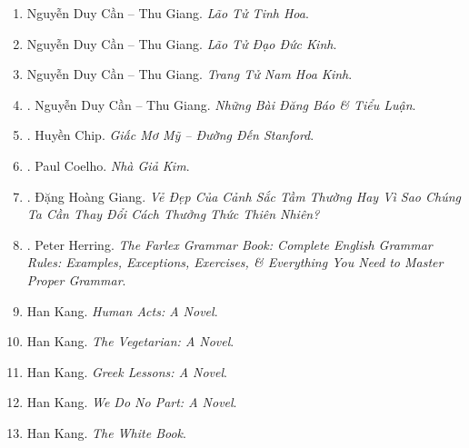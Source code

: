 \documentclass{article}
\begin{document}
\begin{enumerate}
	\item {\sc Nguyễn Duy Cần -- Thu Giang}. {\it Lão Tử Tinh Hoa}.

	\item {\sc Nguyễn Duy Cần -- Thu Giang}. {\it Lão Tử Đạo Đức Kinh}.

	\item {\sc Nguyễn Duy Cần -- Thu Giang}. {\it Trang Tử Nam Hoa Kinh}.

	\item \cite{Can_essay}. {\sc Nguyễn Duy Cần -- Thu Giang}. {\it Những Bài Đăng Báo \& Tiểu Luận}.\hfill{\sf[done]}

	\item \cite{Chip_US_dream}. {\sc Huyền Chip}. {\it Giấc Mơ Mỹ -- Đường Đến Stanford}.\hfill{\sf[done]}

	\item \cite{Coelho_alchemist_VN}. {\sc Paul Coelho}. {\it Nhà Giả Kim}.\hfill{\sf[done]}

	\item \cite{Giang_nature}. {\sc Đặng Hoàng Giang}. {\it Vẻ Đẹp Của Cảnh Sắc Tầm Thường Hay Vì Sao Chúng Ta Cần Thay Đổi Cách Thưởng Thức Thiên Nhiên?}\hfill{\sf[done]}

	\item \cite{Herring2016}. {\sc Peter Herring}. {\it The Farlex Grammar Book: Complete English Grammar Rules: Examples, Exceptions, Exercises, \& Everything You Need to Master Proper Grammar}.\hfill{\sf[reading]}

	\item {\sc Han Kang}. {\it Human Acts: A Novel}.

	\item {\sc Han Kang}. {\it The Vegetarian: A Novel}.

	\item {\sc Han Kang}. {\it Greek Lessons: A Novel}.

	\item {\sc Han Kang}. {\it We Do No Part: A Novel}.

	\item {\sc Han Kang}. {\it The White Book}. {}


\end{enumerate}
\end{document}
